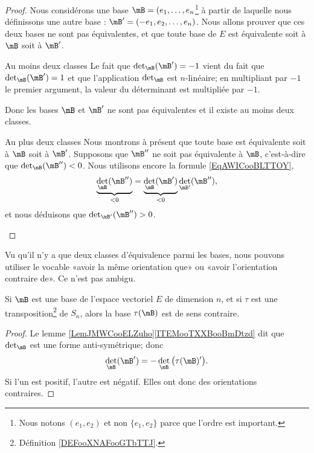 \begin{proof}
	Nous considérons une base \( \mB=(e_1,\ldots, e_n\)\footnote{Nous notons \( (e_1,e_2)\) et non \( \{ e_1,e_2 \}\) parce que l'ordre est important.} à partir de laquelle nous définissons une autre base : \( \mB'=( -e_1,e_2,\ldots, e_n )\). Nous allons prouver que ces deux bases ne sont pas équivalentes, et que toute base de \( E\) est équivalente soit à \( \mB\) soit à \( \mB'\).

	\begin{subproof}
		\item[Au moins deux classes]
		Le fait que \( \det_{\mB}(\mB')=-1\) vient du fait que \( \det_{\mB}(\mB')=1\) et que l'application \( \det_{\mB}\) est \( n\)-linéaire; en multipliant par \( -1\) le premier argument, la valeur du déterminant est multipliée par \( -1\).

		Donc les bases \( \mB\) et \( \mB'\) ne sont pas équivalentes et il existe au moins deux classes.

		\item[Au plus deux classes]
		Nous montrons à présent que toute base est équivalente soit à \( \mB\) soit à \( \mB'\). Supposons que \( \mB''\) ne soit pas équivalente à \( \mB\), c'est-à-dire que \( \det_{\mB}(\mB'')<0\). Nous utilisons encore la formule \eqref{EqAWICooBLTTOY},
		\begin{equation}
			\underbrace{\det_{\mB}(\mB'')}_{<0}=\underbrace{\det_{\mB}(\mB')}_{<0}\det_{\mB'}(\mB''),
		\end{equation}
		et nous déduisons que \( \det_{\mB'}(\mB'')>0\).
	\end{subproof}
\end{proof}

\begin{normaltext}
	Vu qu'il n'y a que deux classes d'équivalence parmi les bases, nous pouvons utiliser le vocable «avoir la même orientation que» ou «avoir l'orientation contraire de». Ce n'est pas ambigu.
\end{normaltext}

\begin{proposition}
	Si \( \mB\) est une base de l'espace vectoriel \( E\) de dimension \( n\), et si \( \tau\) est une transposition\footnote{Définition \ref{DEFooXNAFooGTbTTJ}.} de \( S_n\), alors la base \( \tau(\mB)\) est de sens contraire.
\end{proposition}

\begin{proof}
	Le lemme \ref{LemJMWCooELZuho}\ref{ITEMooTXXBooBmDtzd} dit que \( \det_{\mB}\) est une forme anti-symétrique; donc
	\begin{equation}
		\det_{\mB}(\mB')=-\det_{\mB}\big( \tau(\mB)' \big).
	\end{equation}
	Si l'un est positif, l'autre est négatif. Elles ont donc des orientations contraires.
\end{proof}

